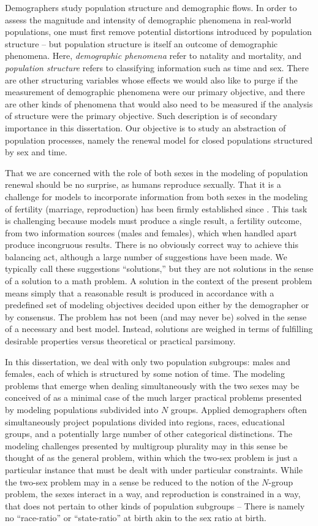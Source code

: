 Demographers study population structure and demographic flows. In order
to assess the magnitude and intensity of demographic phenomena in real-world
populations, one must first remove potential distortions introduced by
population structure -- but population structure is itself an outcome
of demographic phenomena. Here, \textit{demographic phenomena} refer to natality
and mortality, and \textit{population structure} refers to classifying
information such as time and sex. There are other structuring variables whose effects we would also
like to purge if the measurement of demographic phenomena 
were our primary objective, and there are other kinds of phenomena that would
also need to be measured if the analysis of structure were the primary
objective. Such description is of secondary importance in this dissertation. Our
objective is to study an abstraction of population processes, namely the 
renewal model for closed populations structured by sex and time.

That we are concerned with the role of both sexes in the modeling of population
renewal should be no surprise, as humans reproduce sexually. That it is a
challenge for models to incorporate information from both sexes in the modeling
of fertility (marriage, reproduction) has been firmly established since
\citet{karmel1947relations}. This task is challenging because models must
produce a single result, a fertility outcome, from two information sources
(males and females), which when handled apart produce incongruous results. 
There is no obviously correct way to achieve this balancing act, although a
large number of suggestions have been made. We typically call these suggestions
``solutions,'' but they are not solutions in the sense of a solution to a math problem. A
solution in the context of the present problem means simply that a reasonable
result is produced in accordance with a predefined set of modeling objectives
decided upon either by the demographer or by consensus. The problem has not been
(and may never be) solved in the sense of a necessary and best model. Instead,
solutions are weighed in terms of fulfilling desirable properties versus theoretical 
or practical parsimony.

In this dissertation, we deal with only two population subgroups: males and
females, each of which is structured by some notion of time. The modeling
problems that emerge when dealing simultaneously with the two sexes may be
conceived of as a minimal case of the much larger practical problems 
presented by modeling populations subdivided into $N$
groups. Applied demographers often simultaneously project
populations divided into regions, races, educational groups, and a potentially
large number of other categorical distinctions. The modeling
challenges presented by multigroup plurality may in this sense be thought of as
the general problem, within which the two-sex problem is just a particular
instance that must be dealt with under particular constraints. While the two-sex
problem may in a sense be reduced to the notion of the $N$-group problem, the
sexes interact in a way, and reproduction is constrained in a way, that does 
not pertain to other kinds of population subgroups -- There is namely no
``race-ratio'' or ``state-ratio'' at birth akin to the sex ratio at birth.

